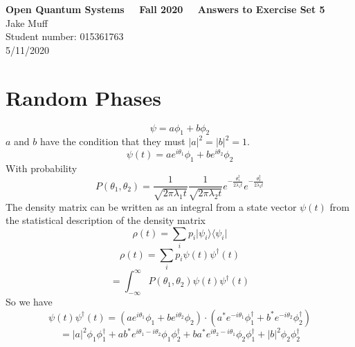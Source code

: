\documentclass[12pt]{article}
\newcommand{\ket}[1]{\vert{#1}\rangle}
\newcommand{\bra}[1]{\langle{#1}\vert}
\begin{document}
\normalsize

\baselineskip 14pt

\begin{center}
{\Large {\bf Open Quantum Systems \ \ Fall 2020 \ \  Answers to Exercise Set 5}}\\
{\large { Jake Muff}}\\
{Student number: 015361763}\\
{5/11/2020}
\end{center}



\section{Random Phases}
$$ \psi = a \phi_1 + b \phi_2 $$
$a$ and $b$ have the condition that they must $|a|^2 = |b|^2 =1$. 
$$ \psi (t) = a e^{i \theta_1} \phi_1 + b e^{i \theta_2} \phi_2 $$
With probability 
$$ P(\theta_1, \theta_2) = \frac{1}{\sqrt{2 \pi \lambda_1 t}} \frac{1}{\sqrt{2 \pi \lambda_2 t}} e^{- \frac{\theta_1^2}{2 \lambda_1 t}}e^{- \frac{\theta_2^2}{2 \lambda_2 t}} $$
The density matrix can be written as an integral from a state vector $\psi (t)$ from the statistical description of the density matrix 
$$ \rho (t) = \sum_i p_i \ket{\psi_i}\bra{\psi_i} $$
$$ \rho (t) = \sum_i p_i \psi (t) \psi^{\dagger} (t) $$
$$ = \int_{- \infty}^{\infty} P(\theta_1, \theta_2) \psi (t) \psi^{\dagger} (t) $$
So we have 
$$ \psi (t) \psi^{\dagger} (t) = (ae^{i \theta_1} \phi_1 + be^{i \theta_2} \phi_2) \cdot (a^* e^{-i \theta_1} \phi_1^{\dagger} + b^* e^{-i \theta_2} \phi_2^{\dagger}  ) $$
$$ = |a|^2 \phi_1 \phi_1^{\dagger} + ab^* e^{i \theta_1 - i\theta_2} \phi_1 \phi_2^{\dagger} + ba^* e^{i \theta_2 - i \theta_1} \phi_2 \phi_1^{\dagger} + |b|^2 \phi_2 \phi_2^{\dagger} $$
\end{document}
